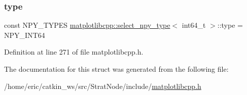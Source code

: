 \subsubsection{\texorpdfstring{type}{type}}
{\footnotesize\ttfamily const N\+P\+Y\+\_\+\+T\+Y\+P\+ES \mbox{\hyperlink{structmatplotlibcpp_1_1select__npy__type}{matplotlibcpp\+::select\+\_\+npy\+\_\+type}}$<$ int64\+\_\+t $>$\+::type = N\+P\+Y\+\_\+\+I\+N\+T64\hspace{0.3cm}{\ttfamily [static]}}



Definition at line 271 of file matplotlibcpp.\+h.



The documentation for this struct was generated from the following file\+:\begin{DoxyCompactItemize}
\item 
/home/eric/catkin\+\_\+ws/src/\+Strat\+Node/include/\mbox{\hyperlink{matplotlibcpp_8h}{matplotlibcpp.\+h}}\end{DoxyCompactItemize}
